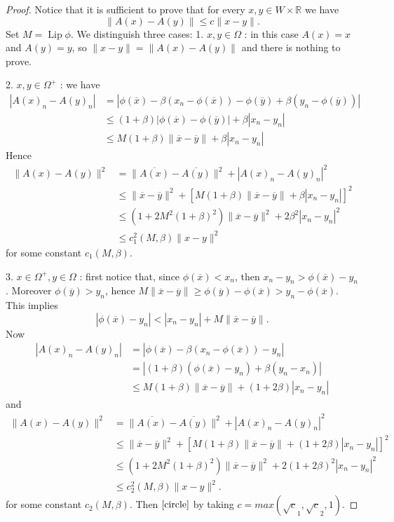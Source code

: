 \documentclass[12pt]{article}
\theoremstyle{definition}
\DeclareMathOperator\Lip{Lip}
\begin{document}
\begin{proof}
Notice that it is sufficient to prove that for every $x,y \in W \times \mathbb{R}$ we have
\begin{equation}\label{circle}
 \|A(x)-A(y)\| \le c\|x-y \|.
\end{equation}
Set $M= \Lip \phi$. We distinguish three cases: 1. $x,y \in \Omega$ : in this case $A(x)=x$ and $A(y)=y$, so $\|x-y \| = \|A(x)-A(y)\|$ and there is nothing to prove.

2. $x,y \in \Omega^+$ : we have 
\begin{align*}
|A(x)_n-A(y)_n|&=|\phi(\overline x)-\beta(x_n-\phi(\overline x))-\phi(\overline y)+\beta(y_n-\phi(\overline y))| \\
				& \le (1+\beta)|\phi(\overline x)-\phi(\overline y)| + \beta|x_n-y_n|\\
				& \le M(1+\beta)\|\overline x -\overline y\| + \beta|x_n-y_n|
\end{align*}
Hence
\begin{align*}
\|A(x)-A(y)\|^2 &=\|\overline {A(x)} -\overline {A(y)}\|^2+|A(x)_n-A(y)_n|^2\\
& \le \|\overline x -\overline y\|^2+[M(1+\beta)\|\overline x -\overline y\| + \beta|x_n-y_n|]^2 \\
& \le (1+2M^2(1+\beta)^2)\|\overline x -\overline y\|^2+2\beta^2|x_n-y_n|^2 \\
& \le c_1^2(M,\beta)\|x-y\|^2
\end{align*}
for some constant $c_1(M,\beta)$.

3. $x \in \Omega^+, y \in \Omega$ : first notice that, since $\phi(\overline x) < x_n$, then $x_n-y_n>\phi(\overline x)-y_n$. Moreover $\phi(\overline y) > y_n$, hence $M\|\overline x -\overline y\| \ge \phi(\overline y)-\phi(\overline x)> y_n-\phi(\overline x).$ This implies
\[ |\phi(\overline x)-y_n |< |x_n-y_n|+M\|\overline x -\overline y\|.\]
Now
\begin{align*}
|A(x)_n-A(y)_n|&=|\phi(\overline x)-\beta(x_n-\phi(\overline x))-y_n| \\
				&=|(1+\beta)(\phi(\overline x)-y_n)+\beta(y_n-x_n)|\\
				&\le M(1+\beta)\|\overline x -\overline y\|+(1+2\beta)|x_n-y_n|
\end{align*}
and
\begin{align*}
\|A(x)-A(y)\|^2 &=\|\overline {A(x)} -\overline {A(y)}\|^2+|A(x)_n-A(y)_n|^2\\
& \le \|\overline x -\overline y\|^2+[M(1+\beta)\|\overline x -\overline y\|+(1+2\beta)|x_n-y_n|]^2 \\
& \le (1+2M^2(1+\beta)^2)\|\overline x -\overline y\|^2+2(1+2\beta)^2|x_n-y_n|^2 \\
& \le c_2^2(M,\beta)\|x-y\|^2.
\end{align*}
for some constant $c_2(M,\beta)$. Then $\eqref{circle}$ by taking $c=max(\sqrt c_1,\sqrt c_2,1)$.

\end{proof}
\end{document}
